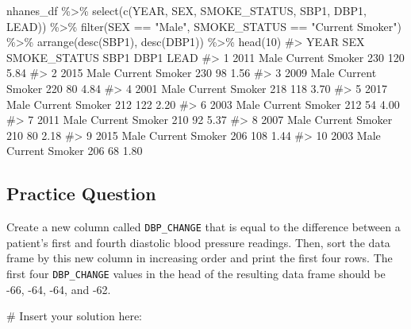 \documentclass[
  letterpaper,
]{krantz}
\makeatletter
\newenvironment{Shaded}{\begin{snugshade}}{\end{snugshade}}
\newcommand{\CommentTok}[1]{\textcolor[rgb]{0.37,0.37,0.37}{#1}}
\newcommand{\DecValTok}[1]{\textcolor[rgb]{0.68,0.00,0.00}{#1}}
\newcommand{\FunctionTok}[1]{\textcolor[rgb]{0.28,0.35,0.67}{#1}}
\newcommand{\NormalTok}[1]{\textcolor[rgb]{0.00,0.23,0.31}{#1}}
\newcommand{\SpecialCharTok}[1]{\textcolor[rgb]{0.37,0.37,0.37}{#1}}
\newcommand{\StringTok}[1]{\textcolor[rgb]{0.13,0.47,0.30}{#1}}
\newenvironment{kframe}{%
\medskip{}
\setlength{\fboxsep}{.8em}
 \def\at@end@of@kframe{}%
 \ifinner\ifhmode%
  \def\at@end@of@kframe{\end{minipage}}%
  \begin{minipage}{\columnwidth}%
 \fi\fi%
 \def\FrameCommand##1{\hskip\@totalleftmargin \hskip-\fboxsep
 \colorbox{shadecolor}{##1}\hskip-\fboxsep
     \hskip-\linewidth \hskip-\@totalleftmargin \hskip\columnwidth}%
 \MakeFramed {\advance\hsize-\width
   \@totalleftmargin\z@ \linewidth\hsize
   \@setminipage}}%
 {\par\unskip\endMakeFramed%
 \at@end@of@kframe}
\renewenvironment{Shaded}{\begin{kframe}}{\end{kframe}}
\makeatother
\begin{document}
\begin{Shaded}
\begin{Highlighting}[]
\NormalTok{nhanes\_df }\SpecialCharTok{\%\textgreater{}\%} 
  \FunctionTok{select}\NormalTok{(}\FunctionTok{c}\NormalTok{(YEAR, SEX, SMOKE\_STATUS, SBP1, DBP1, LEAD)) }\SpecialCharTok{\%\textgreater{}\%}
  \FunctionTok{filter}\NormalTok{(SEX }\SpecialCharTok{==} \StringTok{"Male"}\NormalTok{, SMOKE\_STATUS }\SpecialCharTok{==} \StringTok{"Current Smoker"}\NormalTok{) }\SpecialCharTok{\%\textgreater{}\%}
  \FunctionTok{arrange}\NormalTok{(}\FunctionTok{desc}\NormalTok{(SBP1), }\FunctionTok{desc}\NormalTok{(DBP1)) }\SpecialCharTok{\%\textgreater{}\%}
  \FunctionTok{head}\NormalTok{(}\DecValTok{10}\NormalTok{)}
\CommentTok{\#\textgreater{}    YEAR  SEX   SMOKE\_STATUS SBP1 DBP1 LEAD}
\CommentTok{\#\textgreater{} 1  2011 Male Current Smoker  230  120 5.84}
\CommentTok{\#\textgreater{} 2  2015 Male Current Smoker  230   98 1.56}
\CommentTok{\#\textgreater{} 3  2009 Male Current Smoker  220   80 4.84}
\CommentTok{\#\textgreater{} 4  2001 Male Current Smoker  218  118 3.70}
\CommentTok{\#\textgreater{} 5  2017 Male Current Smoker  212  122 2.20}
\CommentTok{\#\textgreater{} 6  2003 Male Current Smoker  212   54 4.00}
\CommentTok{\#\textgreater{} 7  2011 Male Current Smoker  210   92 5.37}
\CommentTok{\#\textgreater{} 8  2007 Male Current Smoker  210   80 2.18}
\CommentTok{\#\textgreater{} 9  2015 Male Current Smoker  206  108 1.44}
\CommentTok{\#\textgreater{} 10 2003 Male Current Smoker  206   68 1.80}
\end{Highlighting}
\end{Shaded}

\subsection{Practice Question}\label{practice-question-9}

Create a new column called \texttt{DBP\_CHANGE} that is equal to the
difference between a patient's first and fourth diastolic blood pressure
readings. Then, sort the data frame by this new column in increasing
order and print the first four rows. The first four \texttt{DBP\_CHANGE}
values in the head of the resulting data frame should be -66, -64, -64,
and -62.

\begin{Shaded}
\begin{Highlighting}[]
\CommentTok{\# Insert your solution here:                    }
\end{Highlighting}
\end{Shaded}
\end{document}
